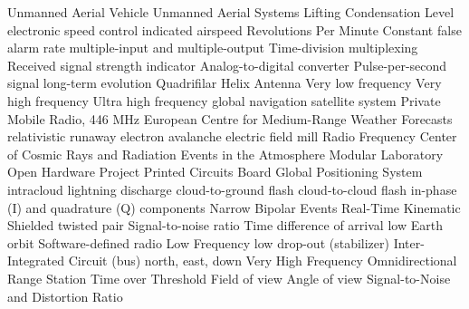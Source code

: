  {Unmanned Aerial Vehicle}
 {Unmanned Aerial Systems}
 {Lifting Condensation Level}
 {electronic speed control}
 {indicated airspeed}
 {Revolutions Per Minute}
 {Constant false alarm rate}
 {multiple-input and multiple-output}
 {Time-division multiplexing}
 {Received signal strength indicator}
 {Analog-to-digital converter}
 {Pulse-per-second signal}
 {long-term evolution}
 {Quadrifilar Helix Antenna}
 {Very low frequency}
 {Very high frequency}
 {Ultra high frequency}
 {global navigation satellite system}
 {Private Mobile Radio, 446 MHz}
 {European Centre for Medium-Range Weather Forecasts}
 {relativistic runaway electron avalanche}
 {electric field mill}
 {Radio Frequency}
 {Center of Cosmic Rays and Radiation Events in the Atmosphere}
 {Modular Laboratory Open Hardware Project}
 {Printed Circuits Board}
 {Global Positioning System}
 {intracloud lightning discharge}
 {cloud-to-ground flash}
 {cloud-to-cloud flash}
 {in-phase (I) and quadrature (Q) components}
 {Narrow Bipolar Events}
 {Real-Time Kinematic}
 {Shielded twisted pair}
 {Signal-to-noise ratio}
 {Time difference of arrival}
  {low Earth orbit}
 {Software-defined radio}
 {Low Frequency}
 {low drop-out (stabilizer)}
 {Inter-Integrated Circuit (bus)}
 {north, east, down}
 {Very High Frequency Omnidirectional Range Station}
 {Time over Threshold}
 {Field of view}
 {Angle of view}
 {Signal-to-Noise and Distortion Ratio}

